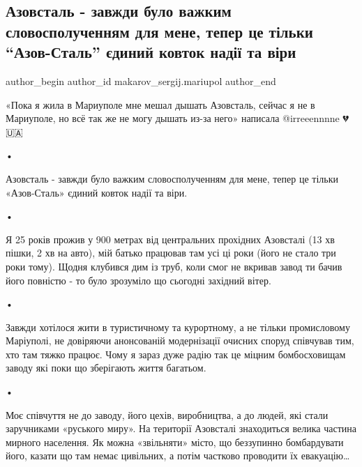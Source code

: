  
 
 
 
 

\subsection{Азовсталь - завжди було важким словосполученням для мене, тепер це тільки \enquote{Азов-Сталь} єдиний ковток надії та віри}
\label{sec:04_05_2022.fb.makarov_sergij.mariupol.1.azovstal___zavzhdi_b}

\ifcmt
 author_begin
   author_id makarov_sergij.mariupol
 author_end
\fi

«Пока я жила в Мариуполе мне мешал дышать Азовсталь, сейчас я не в Мариуполе,
но всё так же не могу дышать из-за него» написала @irreeennnne 💔🇺🇦

•

Азовсталь - завжди було важким словосполученням для мене, тепер це тільки
«Азов-Сталь» єдиний ковток надії та віри.

•

Я 25 років прожив у 900 метрах від центральних прохідних Азовсталі (13 хв
пішки, 2 хв на авто), мій батько працював там усі ці роки (його не стало три
роки тому). Щодня клубився  дим із труб, коли смог не вкривав  завод ти бачив
його повністю - то було зрозуміло що сьогодні західний вітер.

•

Завжди хотілося жити в туристичному та курортному, а не тільки промисловому
Маріуполі, не довіряючи анонсованій модернізації очисних споруд співчував тим,
хто там тяжко працює. Чому я зараз дуже радію так це міцним бомбосховищам
заводу які поки що зберігають життя багатьом.

•

Моє співчуття не до заводу, його цехів, виробництва, а до людей, які стали
заручниками «руського миру». На території Азовсталі знаходиться велика частина
мирного населення. Як можна «звільняти» місто, що  беззупинно бомбардувати
його, казати що там немає цивільних, а потім частково проводити їх евакуацію…

